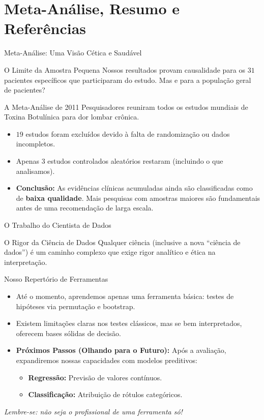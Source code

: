 \section{Meta-Análise, Resumo e Referências}

\begin{frame}{Meta-Análise: Uma Visão Cética e Saudável}
    \begin{block}{O Limite da Amostra Pequena}
        Nossos resultados provam causalidade para os $31$ pacientes específicos que participaram do estudo. Mas e para a população geral de pacientes?
    \end{block}
    \begin{block}{A Meta-Análise de 2011}
        Pesquisadores reuniram todos os estudos mundiais de Toxina Botulínica para dor lombar crônica.
        \begin{itemize}
            \item $19$ estudos foram excluídos devido à falta de randomização ou dados incompletos.
            \item Apenas $3$ estudos controlados aleatórios restaram (incluindo o que analisamos).
            \item \textbf{Conclusão:} As evidências clínicas acumuladas ainda são classificadas como de \textbf{baixa qualidade}. Mais pesquisas com amostras maiores são fundamentais antes de uma recomendação de larga escala.
        \end{itemize}
    \end{block}
\end{frame}

\begin{frame}{O Trabalho do Cientista de Dados}
    \begin{block}{O Rigor da Ciência de Dados}
        Qualquer ciência (inclusive a nova ``ciência de dados'') é um caminho complexo que exige rigor analítico e ética na interpretação.
    \end{block}
    \begin{block}{Nosso Repertório de Ferramentas}
        \begin{itemize}
            \item Até o momento, aprendemos apenas uma ferramenta básica: testes de hipóteses via permutação e bootstrap.
            \item Existem limitações claras nos testes clássicos, mas se bem interpretados, oferecem bases sólidas de decisão.
            \item \textbf{Próximos Passos (Olhando para o Futuro):} Após a avaliação, expandiremos nossas capacidades com modelos preditivos:
            \begin{itemize}
                \item \textbf{Regressão:} Previsão de valores contínuos.
                \item \textbf{Classificação:} Atribuição de rótulos categóricos.
            \end{itemize}
        \end{itemize}
    \end{block}
    \centering
    \textit{Lembre-se: não seja o profissional de uma ferramenta só!}
\end{frame}

